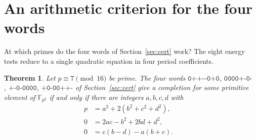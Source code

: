 \documentclass[11pt]{article}
\newtheorem{theorem}{Theorem}
\theoremstyle{remark}
\newcommand{\F}{\mathbb F}
\begin{document}
\section{An arithmetic criterion for the four words}\label{sec:arith}
At which primes do the four words of Section~\ref{sec:cert} work? The eight energy tests reduce to a single quadratic equation in four period coefficients.

\begin{theorem}\label{arith}
Let $p\equiv7\pmod{16}$ be prime. The four words $\texttt{0++-{}-0+0}$, $\texttt{0000+-0-}$, $\texttt{+-0-0000}$, $\texttt{+0-00++-}$ of Section~\ref{sec:cert} give a completion for some primitive element of $\F_{p^2}$ if and only if there are integers $a,b,c,d$ with
\begin{align}
 p&=a^2+2(b^2+c^2+d^2),\label{norm}\\
 0&=2ac-b^2+2bd+d^2,\label{relative}\\
 0&=c(b-d)-a(b+c).\label{fixedword}
\end{align}
\end{theorem}
\end{document}
